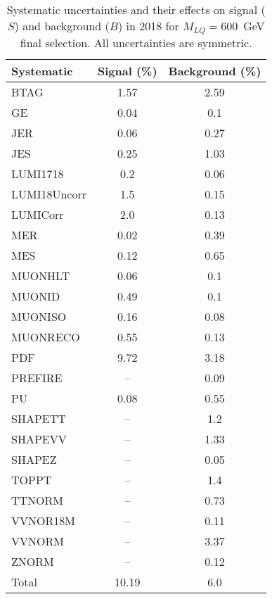 \begin{table}[htbp]
\begin{center}
\caption{Systematic uncertainties and their effects on signal ($S$) and background ($B$) in 2018 for $M_{LQ}=600$~GeV final selection. All uncertainties are symmetric.}
\begin{tabular}{lcc}
\hline\hline
Systematic & Signal (\%) & Background (\%) \\ \hline 
BTAG & 1.57 & 2.59\\ 
GE & 0.04 & 0.1\\ 
JER & 0.06 & 0.27\\ 
JES & 0.25 & 1.03\\ 
LUMI1718 & 0.2 & 0.06\\ 
LUMI18Uncorr & 1.5 & 0.15\\ 
LUMICorr & 2.0 & 0.13\\ 
MER & 0.02 & 0.39\\ 
MES & 0.12 & 0.65\\ 
MUONHLT & 0.06 & 0.1\\ 
MUONID & 0.49 & 0.1\\ 
MUONISO & 0.16 & 0.08\\ 
MUONRECO & 0.55 & 0.13\\ 
PDF & 9.72 & 3.18\\ 
PREFIRE & -- & 0.09\\ 
PU & 0.08 & 0.55\\ 
SHAPETT & -- & 1.2\\ 
SHAPEVV & -- & 1.33\\ 
SHAPEZ & -- & 0.05\\ 
TOPPT & -- & 1.4\\ 
TTNORM & -- & 0.73\\ 
VVNOR18M & -- & 0.11\\ 
VVNORM & -- & 3.37\\ 
ZNORM & -- & 0.12\\ 
Total & 10.19 & 6.0\\ \hline \hline
\end{tabular}
\label{tab:SysUncertainties_uujj_600}
\end{center}
\end{table}

